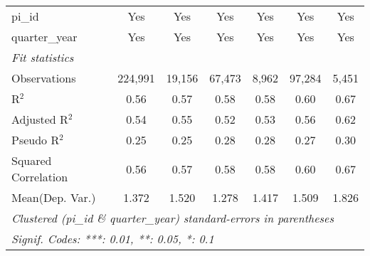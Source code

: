 \begin{tabular}{lcccccc}
   pi\_id                                                     & Yes           & Yes           & Yes           & Yes           & Yes           & Yes\\  
   quarter\_year                                              & Yes           & Yes           & Yes           & Yes           & Yes           & Yes\\  
   \midrule
   \emph{Fit statistics}\\
   Observations                                               & 224,991       & 19,156        & 67,473        & 8,962         & 97,284        & 5,451\\  
   R$^2$                                                      & 0.56          & 0.57          & 0.58          & 0.58          & 0.60          & 0.67\\  
   Adjusted R$^2$                                             & 0.54          & 0.55          & 0.52          & 0.53          & 0.56          & 0.62\\  
   Pseudo R$^2$                                               & 0.25          & 0.25          & 0.28          & 0.28          & 0.27          & 0.30\\  
   Squared Correlation                                        & 0.56          & 0.57          & 0.58          & 0.58          & 0.60          & 0.67\\  
Mean(Dep. Var.) & 1.372 & 1.520 & 1.278 & 1.417 & 1.509 & 1.826 \\
   \midrule \midrule
   \multicolumn{7}{l}{\emph{Clustered (pi\_id \& quarter\_year) standard-errors in parentheses}}\\
   \multicolumn{7}{l}{\emph{Signif. Codes: ***: 0.01, **: 0.05, *: 0.1}}\\
\end{tabular}
\par\endgroup
